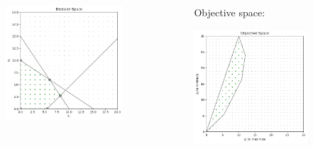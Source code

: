 \documentclass[]{beamer}
\begin{document}
\begin{frame}
\begin{columns}
\begin{column}{0.5\textwidth}
      \begin{center}
      \includegraphics[height=4.25cm]{decisionSpace.png} 
       \end{center}
      \end{column}
      \begin{column}{0.5\textwidth}
      Objective space:
      
      \begin{center}
      \includegraphics[height=4.25cm]{objectiveSpace.png} 
       \end{center}
      \end{column}
      \end{columns} 

\end{frame}



% 
%
\end{document}
